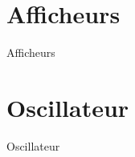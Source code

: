 \documentclass{beamer}
\begin{document}
\section{Afficheurs}
\begin{frame}{Afficheurs}
	
\end{frame}


\section{Oscillateur}
\begin{frame}{Oscillateur}
	
\end{frame}







\end{document}
